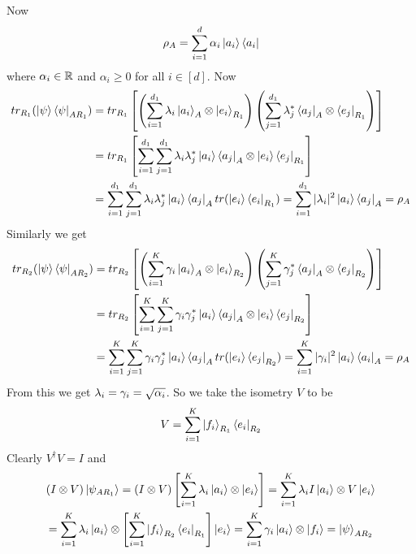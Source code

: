 \documentclass[a4paper, 11pt]{article}
\begin{document}
{Now $$\rho_A=\sum_{i=1}^d\alpha_i\ket{a_i}\bra{a_i}$$ where $\alpha_i\in \mathbb{R}$ and $\alpha_i\geq 0$ for all $i\in [d]$. Now\begin{align*}
	tr_{R_1}(\ket{\psi}\bra{\psi}_{AR_1}) & = tr_{R_1}\left[\left( \sum_{i=1}^{d_1}\lambda_i\ket{a_i}_A\otimes \ket{e_i}_{R_1} \right)\left(\sum_{j=1}^{d_1}\lambda_j^*\bra{a_j}_A\otimes \bra{e_j}_{R_1} \right)\right]   \\
	                                      & = tr_{R_1}\left[\sum_{i=1}^{d_1}\sum_{j=1}^{d_1}\lambda_i\lambda_j^*\ket{a_i}\bra{a_j}_A\otimes \ket{e_i}\bra{e_j}_{R_1}  \right]                                    \\
	                                      & =\sum_{i=1}^{d_1}\sum_{j=1}^{d_1}\lambda_i\lambda_j^*\ket{a_i}\bra{a_j}_A tr(\ket{e_i}\bra{e_i}_{R_1}) = \sum_{i=1}^{d_1}|\lambda_i|^2\ket{a_i}\bra{a_j}_A  =\rho_A
\end{align*}Similarly we get \begin{align*}
tr_{R_2}(\ket{\psi}\bra{\psi}_{AR_2}) & = tr_{R_2}\left[\left( \sum_{i=1}^{K}\gamma_i\ket{a_i}_A\otimes \ket{e_i}_{R_2} \right)\left(\sum_{j=1}^{K}\gamma_j^*\bra{a_j}_A\otimes \bra{e_j}_{R_2} \right)\right]\\
& = tr_{R_2}\left[\sum_{i=1}^{K}\sum_{j=1}^{K}\gamma_i\gamma_j^*\ket{a_i}\bra{a_j}_A\otimes \ket{e_i}\bra{e_j}_{R_2}  \right]\\
& =\sum_{i=1}^{K}\sum_{j=1}^{K}\gamma_i\gamma_j^*\ket{a_i}\bra{a_j}_A tr(\ket{e_i}\bra{e_j}_{R_2})  = \sum_{i=1}^{K}|\gamma_i|^2\ket{a_i}\bra{a_i}_A  =\rho_A
\end{align*} From this we get $\lambda_i=\gamma_i=\sqrt{\alpha_i}$. So we take the isometry $V$ to be $$V=\sum_{i=1}^K\ket{f_i}_{R_1}\bra{e_i}_{R_2}$$Clearly $V^{\dagger}V=I$ and \begin{multline*}
(I\otimes V)\ket{\psi_{AR_1}}=(I\otimes V)\left[\sum_{i=1}^{K}\lambda_i\ket{a_i}\otimes \ket{e_i}\right]=\sum_{i=1}^{K}\lambda_iI\ket{a_i}\otimes V\ket{e_i}\\
=\sum_{i=1}^{K}\lambda_i\ket{a_i}\otimes\left[  \sum_{i=1}^K\ket{f_i}_{R_2}\bra{e_i}_{R_1}\right] \ket{e_i}=\sum_{i=1}^{K}\gamma_i\ket{a_i}\otimes\ket{f_i}=\ket{\psi}_{AR_2}
\end{multline*}
}

\end{document}
